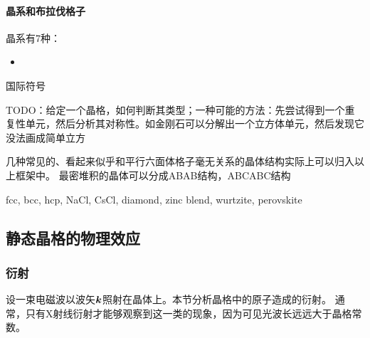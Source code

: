 \paragraph{晶系和布拉伐格子} 晶系有7种：
\begin{itemize}
    \item 
\end{itemize}

国际符号

TODO：给定一个晶格，如何判断其类型；一种可能的方法：先尝试得到一个重复性单元，然后分析其对称性。如金刚石可以分解出一个立方体单元，然后发现它没法画成简单立方

几种常见的、看起来似乎和平行六面体格子毫无关系的晶体结构实际上可以归入以上框架中。
最密堆积的晶体可以分成ABAB结构，ABCABC结构

fcc, bcc, hcp, NaCl, CsCl, diamond, zinc blend, wurtzite, perovskite


\subsection{静态晶格的物理效应}

\subsubsection{衍射}

设一束电磁波以波矢$\vb*{k}$照射在晶体上。本节分析晶格中的原子造成的衍射。
通常，只有X射线衍射才能够观察到这一类的现象，因为可见光波长远远大于晶格常数。


